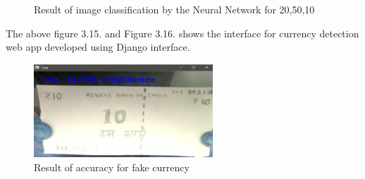 \begin{figure}[h!]
	\centering
	\caption{Result of image classification by the Neural Network for 20,50,10}
\end{figure}
\noindent The above figure 3.15. and Figure 3.16. shows the interface for currency detection web app developed using Django interface.
\begin{figure}
	\centering
	\includegraphics[width=0.6\textwidth]{CHAPTERS/x10.PNG}
	\caption{Result of accuracy for fake currency}
\end{figure}
